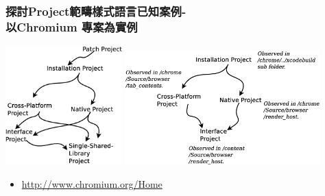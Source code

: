 \documentclass[utf8x]{beamer}
\begin{document}

\begin{frame}%
\frametitle{探討Project範疇樣式語言已知案例-\\\hspace{4pt}以Chromium \dag 專案為實例}
\includegraphics[width=4.5cm]{project-catgory-pattern-language-network.eps}
\includegraphics[width=7.5cm]{chromium-project-category-analysis-view.eps}
\begin{itemize}
\fontsize{8pt}{8pt}\selectfont
\item[\dag] \url{http://www.chromium.org/Home}
\end{itemize}
\end{frame}
\end{document}
